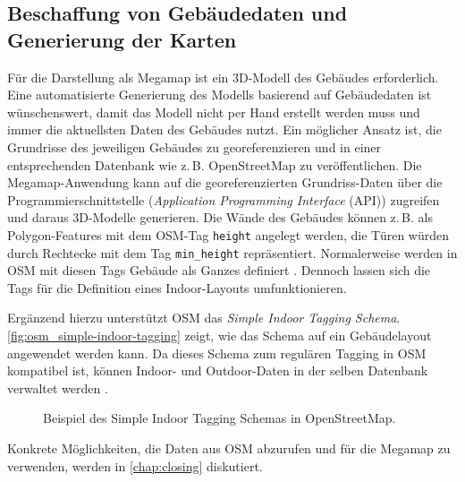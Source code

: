 \subsection{Beschaffung von Gebäudedaten und Generierung der Karten}
Für die Darstellung als Megamap ist ein 3D-Modell des Gebäudes erforderlich.
Eine automatisierte Generierung des Modells basierend auf Gebäudedaten ist wünschenswert, damit das Modell nicht per Hand erstellt werden muss und immer die aktuellsten Daten des Gebäudes nutzt.
Ein möglicher Ansatz ist, die Grundrisse des jeweiligen Gebäudes zu georeferenzieren und in einer entsprechenden Datenbank wie z.\,B. OpenStreetMap zu veröffentlichen.
Die Megamap-Anwendung kann auf die georeferenzierten Grundriss-Daten über die Programmierschnittstelle (\emph{Application Programming Interface} (API)) zugreifen und daraus 3D-Modelle generieren.
Die Wände des Gebäudes können z.\,B. als Polygon-Features mit dem OSM-Tag \lstinline{height} angelegt werden, die Türen würden durch Rechtecke mit dem Tag \lstinline{min_height} repräsentiert.
Normalerweise werden in OSM mit diesen Tags Gebäude als Ganzes definiert \parencite{OpenStreetMapFoundation2018b}.
Dennoch lassen sich die Tags für die Definition eines Indoor-Layouts umfunktionieren.

Ergänzend hierzu unterstützt OSM das \emph{Simple Indoor Tagging Schema}.
\autoref{fig:osm_simple-indoor-tagging} zeigt, wie das Schema auf ein Gebäudelayout angewendet werden kann.
Da dieses Schema zum regulären Tagging in OSM kompatibel ist, können Indoor- und Outdoor-Daten in der selben Datenbank verwaltet werden \parencite{OpenStreetMapFoundation2018c}.
\begin{figure}[tbh]
    \centering
    \caption{Beispiel des Simple Indoor Tagging Schemas in OpenStreetMap. %
    }
    \label{fig:osm_simple-indoor-tagging}
\end{figure}

Konkrete Möglichkeiten, die Daten aus OSM abzurufen und für die Megamap zu verwenden, werden in \autoref{chap:closing} diskutiert.
%
\cleardoublepage
